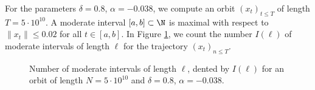 For the parameters $\delta = 0.8$, $\alpha = -0.038$, we compute an
orbit $(x_t)_{t \le T}$ of length $T=5\cdot 10^{10}$. A moderate
interval $[a,b]\subset \N$ is maximal with respect to $\|x_t\| \le
0.02$ for all $t \in [a,b]$. In Figure \ref{F10}, we count the number
$I(\ell)$ of moderate intervals of length $\ell$ for the trajectory
$(x_t)_{n \le T}$.  

\begin{figure}[H]
\begin{center}
\end{center}
\caption{Number of moderate intervals of length $\ell$, dented by $I(\ell)$ 
 for an orbit of length $N=5\cdot 10^{10}$ and $\delta =
  0.8$, $\alpha = -0.038$.\label{F10}}  
\end{figure}

